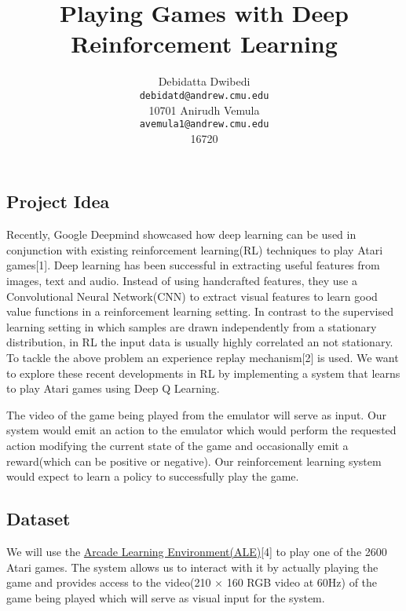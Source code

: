 \documentclass{article} %
\title{Playing Games with Deep Reinforcement Learning}
\author{
Debidatta Dwibedi\\
\texttt{debidatd@andrew.cmu.edu} \\
10701
\And
Anirudh Vemula \\
\texttt{avemula1@andrew.cmu.edu} \\
16720
}
\begin{document}
\maketitle


\subsection*{Project Idea}
Recently, Google Deepmind showcased how deep learning can be used in conjunction with existing reinforcement learning(RL) techniques to play Atari games[1]. Deep learning has been successful in extracting useful features from images, text and audio. Instead of using handcrafted features, they use a Convolutional Neural Network(CNN) to extract visual features to learn good value functions in a reinforcement learning setting. In contrast to the supervised learning setting in which samples are drawn independently from a stationary distribution, in RL the input data is usually highly correlated an not stationary. To tackle the above problem  an experience replay mechanism[2] is used. We want to explore these recent developments in RL by implementing a system that learns to play Atari games using Deep Q Learning.

The video of the game being played from the emulator will serve as input. Our system would emit an action to the emulator which would perform the requested action modifying the current state of the game and occasionally emit a reward(which can be positive or negative). Our reinforcement learning system would expect to learn a policy to successfully play the game.

\subsection*{Dataset}

We will use the \href{http://www.arcadelearningenvironment.org/}{Arcade Learning Environment(ALE)}[4] to play one of the 2600 Atari games. The system allows us to interact with it by actually playing the game and provides access to the video(210 $\times$ 160 RGB video at 60Hz) of the game being played which will serve as visual input for the system. 
\end{document}

